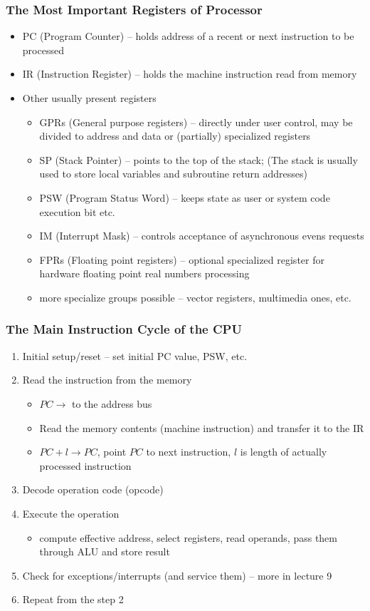 \documentclass{beamer}
\begin{document}
\begin{frame}
\frametitle{The Most Important Registers of Processor}
\begin{itemize}
\item PC (Program Counter) -- holds address of a recent or next instruction to be processed
\item IR (Instruction Register) -- holds the machine instruction read from memory
\item Other usually present registers
\begin{itemize}
\item GPRs (General purpose registers) -- directly under user control, may be divided to address and data or (partially) specialized registers
\item SP (Stack Pointer) -- points to the top of the stack; (The stack is usually used to store local variables and subroutine return addresses)
\item PSW (Program Status Word) -- keeps state as user or system code execution bit etc.
\item IM (Interrupt Mask) -- controls acceptance of asynchronous evens requests
\item FPRs (Floating point registers) -- optional specialized register for hardware floating point real numbers processing
\item more specialize groups possible -- vector registers, multimedia ones, etc.
\end{itemize}
\end{itemize}
\end{frame}

\begin{frame}
\frametitle{The Main Instruction Cycle of the CPU}
\begin{enumerate}
  \item Initial setup/reset -- set initial PC value, PSW, etc.
  \item Read the instruction from the memory
  \begin{itemize}
    \item $PC \to$ to the address bus
    \item Read the memory contents (machine instruction) and transfer it to the IR
    \item $PC+l \to PC$, point $PC$ to next instruction, $l$ is length of actually processed instruction
  \end{itemize}
  \item Decode operation code (opcode)
  \item Execute the operation
  \begin{itemize}
    \item compute effective address, select registers, read operands, pass them through ALU and store result
  \end{itemize}
  \item Check for exceptions/interrupts (and service them) -- more in lecture 9
  \item Repeat from the step 2
\end{enumerate}
\end{frame}
\end{document}
